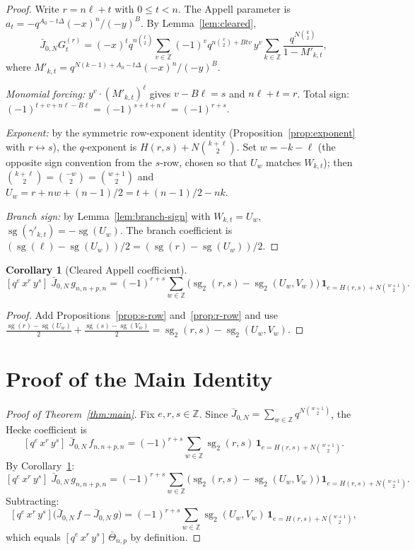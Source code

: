 \documentclass[11pt]{article}
\newtheorem{corollary}[theorem]{Corollary}
\newcommand{\Z}{\mathbb{Z}}
\newcommand{\sg}{\operatorname{sg}}
\newcommand{\sgtwo}{\operatorname{sg}_2}
\begin{document}
\begin{proof}
Write $r=n\ell+t$ with $0\le t<n$.  The Appell parameter is
$a_t=-q^{A_0-t\Delta}(-x)^n/(-y)^B$.  By Lemma~\ref{lem:cleared},
\[
  \bar{J}_{0,N}G_t^{(r)}
  =(-x)^t q^{n\binom{t}{2}}
   \sum_{v\in\Z}(-1)^v q^{n\binom{v}{2}+Btv}\,y^v
   \sum_{k\in\Z}
   \frac{q^{N\binom{k}{2}}}{1-M'_{k,t}},
\]
where $M'_{k,t}=q^{N(k-1)+A_0-t\Delta}(-x)^n/(-y)^B$.

\emph{Monomial forcing:} $y^v\cdot(M'_{k,t})^\ell$ gives $v-B\ell=s$
and $n\ell+t=r$.  Total sign:
$(-1)^{t+v+n\ell-B\ell}=(-1)^{s+t+n\ell}=(-1)^{r+s}$.

\emph{Exponent:} by the symmetric row-exponent identity
(Proposition~\ref{prop:exponent} with $r\leftrightarrow s$),
the $q$-exponent is $H(r,s)+N\binom{k+\ell}{2}$.  Set $w=-k-\ell$
(the opposite sign convention from the $s$-row, chosen so that
$U_w$ matches $W_{k,t}$);
then $\binom{k+\ell}{2}=\binom{-w}{2}=\binom{w+1}{2}$ and
$U_w=r+nw+(n-1)/2=t+(n-1)/2-nk$.

\emph{Branch sign:} by Lemma~\ref{lem:branch-sign} with $W_{k,t}=U_w$,
$\sg(\gamma'_{k,t})=-\sg(U_w)$.  The branch coefficient
is $(\sg(\ell)-\sg(U_w))/2=(\sg(r)-\sg(U_w))/2$.
\end{proof}

\begin{corollary}[Cleared Appell coefficient]\label{cor:g-coeff}
\[
  [q^e\,x^r\,y^s]\;\bar{J}_{0,N}\,g_{n,n+p,n}
  =(-1)^{r+s}\sum_{w\in\Z}
    \bigl(\sgtwo(r,s)-\sgtwo(U_w,V_w)\bigr)\,
    \mathbf{1}_{e=H(r,s)+N\binom{w+1}{2}}.
\]
\end{corollary}

\begin{proof}
Add Propositions~\ref{prop:s-row} and~\ref{prop:r-row} and use
$\frac{\sg(r)-\sg(U_w)}{2}+\frac{\sg(s)-\sg(V_w)}{2}
=\sgtwo(r,s)-\sgtwo(U_w,V_w)$.
\end{proof}

\section{Proof of the Main Identity}\label{sec:proof}

\begin{proof}[Proof of Theorem~\ref{thm:main}]
Fix $e,r,s\in\Z$.  Since
$\bar{J}_{0,N}=\sum_{w\in\Z}q^{N\binom{w+1}{2}}$,
the Hecke coefficient is
\[
  [q^e\,x^r\,y^s]\;\bar{J}_{0,N}\,f_{n,n+p,n}
  =(-1)^{r+s}\sum_{w\in\Z}\sgtwo(r,s)\,
    \mathbf{1}_{e=H(r,s)+N\binom{w+1}{2}}.
\]
By Corollary~\ref{cor:g-coeff}:
\[
  [q^e\,x^r\,y^s]\;\bar{J}_{0,N}\,g_{n,n+p,n}
  =(-1)^{r+s}\sum_{w\in\Z}
    \bigl(\sgtwo(r,s)-\sgtwo(U_w,V_w)\bigr)\,
    \mathbf{1}_{e=H(r,s)+N\binom{w+1}{2}}.
\]
Subtracting:
\[
  [q^e\,x^r\,y^s]\bigl(\bar{J}_{0,N}\,f-\bar{J}_{0,N}\,g\bigr)
  =(-1)^{r+s}\sum_{w\in\Z}\sgtwo(U_w,V_w)\,
    \mathbf{1}_{e=H(r,s)+N\binom{w+1}{2}},
\]
which equals $[q^e\,x^r\,y^s]\,\bar\Theta_{n,p}$ by definition.
\end{proof}
\end{document}
